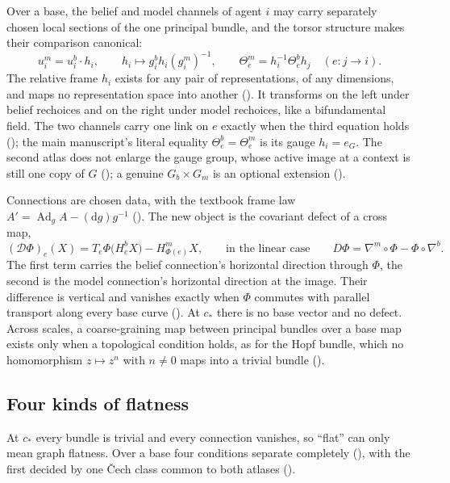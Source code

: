 Over a base, the belief and model channels of agent \(i\) may carry separately chosen local sections of
the one principal bundle, and the torsor structure makes their comparison canonical:
\[
u_i^m=u_i^b\cdot h_i,
\qquad
h_i\longmapsto g_i^bh_i(g_i^m)^{-1},
\qquad
\Theta_e^m=h_i^{-1}\Theta_e^bh_j\quad(e:j\to i).
\]
The relative frame \(h_i\) exists for any pair of representations, of any dimensions, and maps no
representation space into another (). It transforms on the left under
belief rechoices and on the right under model rechoices, like a bifundamental field. The two channels
carry one link on \(e\) exactly when the third equation holds (); the main
manuscript's literal equality \(\Theta^b_e=\Theta^m_e\) is its gauge \(h_i=e_G\). The second atlas does
not enlarge the gauge group, whose active image at a context is still one copy of \(G\)
(); a genuine \(G_b\times G_m\) is an optional extension
().

Connections are chosen data, with the textbook frame law \(A'=\operatorname{Ad}_gA-(\mathrm dg)g^{-1}\)
(). The new object is the covariant defect of a cross map,
\[
(\mathcal D\Phi)_e(X)=T_e\Phi\bigl(H^b_eX\bigr)-H^m_{\Phi(e)}X,
\qquad\text{in the linear case}\qquad
D\Phi=\nabla^m\circ\Phi-\Phi\circ\nabla^b .
\]
The first term carries the belief connection's horizontal direction through \(\Phi\), the second is the
model connection's horizontal direction at the image. Their difference is vertical and vanishes exactly
when \(\Phi\) commutes with parallel transport along every base curve
(). At \(c_*\) there is no base vector and no defect. Across
scales, a coarse-graining map between principal bundles over a base map exists only when a
topological condition holds, as for the Hopf bundle, which no homomorphism \(z\mapsto z^n\) with
\(n\neq0\) maps into a trivial bundle ().

\subsection{Four kinds of flatness}
\label{comp:sb-flatness}

At \(c_*\) every bundle is trivial and every connection vanishes, so ``flat'' can only mean graph
flatness. Over a base four conditions separate completely (), with the first
decided by one Čech class common to both atlases ().

